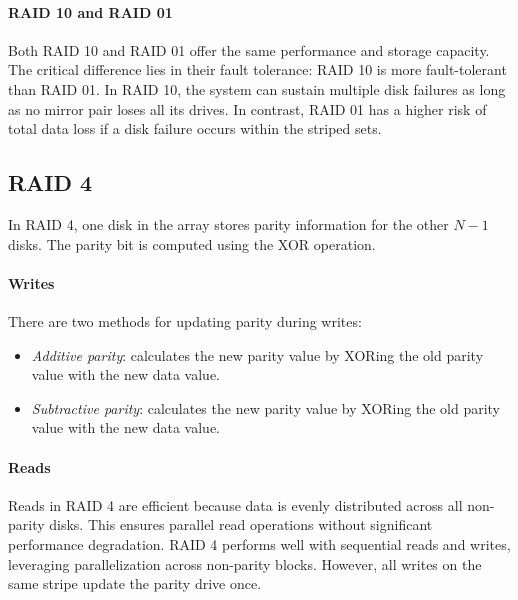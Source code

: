 \paragraph*{RAID 10 and RAID 01}
Both RAID 10 and RAID 01 offer the same performance and storage capacity. 
The critical difference lies in their fault tolerance: RAID 10 is more fault-tolerant than RAID 01. 
In RAID 10, the system can sustain multiple disk failures as long as no mirror pair loses all its drives.
In contrast, RAID 01 has a higher risk of total data loss if a disk failure occurs within the striped sets.

\subsection{RAID 4}
In RAID 4, one disk in the array stores parity information for the other $N-1$ disks. 
The parity bit is computed using the XOR operation.

\paragraph*{Writes}
There are two methods for updating parity during writes:
\begin{itemize}
    \item \textit{Additive parity}: calculates the new parity value by XORing the old parity value with the new data value.
    \item \textit{Subtractive parity}: calculates the new parity value by XORing the old parity value with the new data value.
\end{itemize}

\paragraph*{Reads}
Reads in RAID 4 are efficient because data is evenly distributed across all non-parity disks. 
This ensures parallel read operations without significant performance degradation.
RAID 4 performs well with sequential reads and writes, leveraging parallelization across non-parity blocks. 
However, all writes on the same stripe update the parity drive once.

